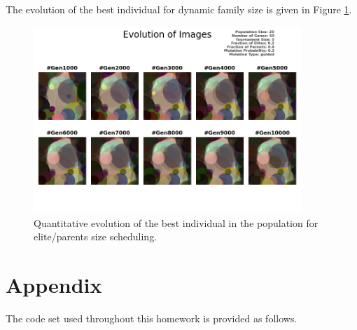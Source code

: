 \documentclass{assignment}
\begin{document}
The evolution of the best individual for dynamic family size is given in Figure \ref{fig:schedule_fit_image}.
\begin{figure}[!htb]
    \centering
    \includegraphics[width=0.9\textwidth]{figures/images_outputFRAC_20_50_5_0.2_0.6_0.2_guided.png}
    \caption{Quantitative evolution of the best individual in the population for elite/parents size scheduling.}
    \label{fig:schedule_fit_image}
\end{figure}



\section*{Appendix}
The code set used throughout this homework is provided as follows. 

% 

% 


\nocite{*} 
\end{document}
